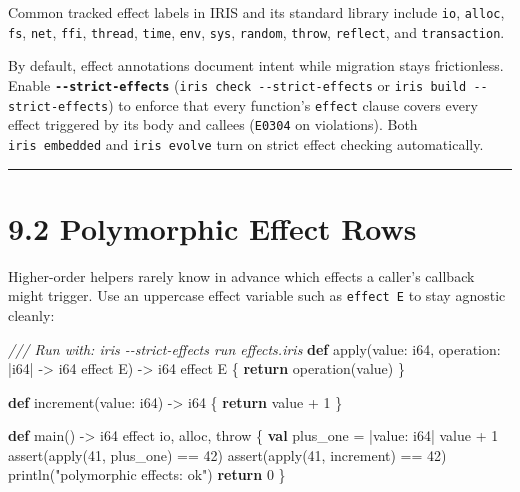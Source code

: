 \documentclass[
  english,
  oneside]{book}
\newenvironment{Shaded}{\begin{snugshade}}{\end{snugshade}}
\newcommand{\CommentTok}[1]{\textcolor[rgb]{0.42,0.60,0.33}{\textit{#1}}}
\newcommand{\ControlFlowTok}[1]{\textcolor[rgb]{0.77,0.53,0.75}{\textbf{#1}}}
\newcommand{\DataTypeTok}[1]{\textcolor[rgb]{0.31,0.79,0.69}{#1}}
\newcommand{\DecValTok}[1]{\textcolor[rgb]{0.71,0.81,0.66}{#1}}
\newcommand{\FunctionTok}[1]{\textcolor[rgb]{0.86,0.86,0.67}{#1}}
\newcommand{\KeywordTok}[1]{\textcolor[rgb]{0.34,0.61,0.84}{\textbf{#1}}}
\newcommand{\NormalTok}[1]{\textcolor[rgb]{0.83,0.83,0.83}{#1}}
\newcommand{\OperatorTok}[1]{\textcolor[rgb]{0.83,0.83,0.83}{#1}}
\newcommand{\StringTok}[1]{\textcolor[rgb]{0.81,0.57,0.47}{#1}}
\begin{document}
Common tracked effect labels in IRIS and its standard library include
\texttt{io}, \texttt{alloc}, \texttt{fs}, \texttt{net}, \texttt{ffi},
\texttt{thread}, \texttt{time}, \texttt{env}, \texttt{sys},
\texttt{random}, \texttt{throw}, \texttt{reflect}, and
\texttt{transaction}.

By default, effect annotations document intent while migration stays
frictionless. Enable \textbf{\texttt{-\/-strict-effects}}
(\texttt{iris\ check\ -\/-strict-effects} or
\texttt{iris\ build\ -\/-strict-effects}) to enforce that every
function's \texttt{effect} clause covers every effect triggered by its
body and callees (\texttt{E0304} on violations). Both
\texttt{iris\ embedded} and \texttt{iris\ evolve} turn on strict effect
checking automatically.

\begin{center}\rule{0.5\linewidth}{0.5pt}\end{center}

\section{9.2 Polymorphic Effect Rows}\label{polymorphic-effect-rows}

Higher-order helpers rarely know in advance which effects a caller's
callback might trigger. Use an uppercase effect variable such as
\texttt{effect\ E} to stay agnostic cleanly:

\begin{Shaded}
\begin{Highlighting}[]
\CommentTok{/// Run with: iris {-}{-}strict{-}effects run effects.iris}
\KeywordTok{def}\NormalTok{ apply(value: }\DataTypeTok{i64}\NormalTok{, operation: }\OperatorTok{|}\DataTypeTok{i64}\OperatorTok{|} \OperatorTok{{-}\textgreater{}} \DataTypeTok{i64}\NormalTok{ effect E) }\OperatorTok{{-}\textgreater{}} \DataTypeTok{i64}\NormalTok{ effect E \{}
    \ControlFlowTok{return}\NormalTok{ operation(value)}
\NormalTok{\}}

\KeywordTok{def}\NormalTok{ increment(value: }\DataTypeTok{i64}\NormalTok{) }\OperatorTok{{-}\textgreater{}} \DataTypeTok{i64}\NormalTok{ \{}
    \ControlFlowTok{return}\NormalTok{ value }\OperatorTok{+} \DecValTok{1}
\NormalTok{\}}

\KeywordTok{def}\NormalTok{ main() }\OperatorTok{{-}\textgreater{}} \DataTypeTok{i64}\NormalTok{ effect io, alloc, throw \{}
    \KeywordTok{val}\NormalTok{ plus\_one }\OperatorTok{=} \OperatorTok{|}\NormalTok{value: }\DataTypeTok{i64}\OperatorTok{|}\NormalTok{ value }\OperatorTok{+} \DecValTok{1}
    \FunctionTok{assert}\NormalTok{(apply(}\DecValTok{41}\NormalTok{, plus\_one) }\OperatorTok{==} \DecValTok{42}\NormalTok{)}
    \FunctionTok{assert}\NormalTok{(apply(}\DecValTok{41}\NormalTok{, increment) }\OperatorTok{==} \DecValTok{42}\NormalTok{)}
\NormalTok{    println(}\StringTok{"polymorphic effects: ok"}\NormalTok{)}
    \ControlFlowTok{return} \DecValTok{0}
\NormalTok{\}}
\end{Highlighting}
\end{Shaded}
\end{document}
